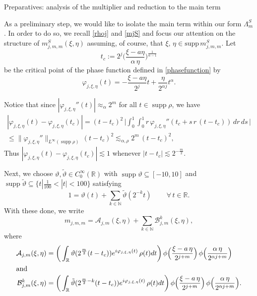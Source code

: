 \documentclass[a4paper,reqno]{amsart}
\makeatletter
\def\subsubsection{\@startsection{subsubsection}{3}%
	\z@{.5\linespacing\@plus.7\linespacing}{-.5em}%
	{\normalfont\bfseries\boldmath}}
\numberwithin{equation}{section}
\theoremstyle{definition}
\newcommand{\R}{\mathbb{R}}
\newcommand{\N}{\mathbb{N}}
\def\a{\alpha}
\def\B{\mathcal{B}}
\def\L{\Lambda}
\DeclareMathOperator{\supp}{supp}
\makeatother
\begin{document}
\subsubsection{Preparatives: analysis of the multiplier and reduction to the main term}

As a preliminary step, we would like to isolate the main term within our form $\L_m^{S}$. In order to do so, we recall \eqref{rhoj} and \eqref{mjS} and focus our attention on the structure of $m_{j,m,m}^S(\xi, \eta)$ assuming, of course, that $\xi,\, \eta\in \textrm{supp}\,m_{j,m,m}^S$. Let
\begin{equation}
t_c:=2^j\Big(\frac{\xi-a\eta}{\a\,\eta}\Big)^{\frac1{\a-1}}
\end{equation}
be the critical point of the phase function defined in \eqref{phasefunction} by
\begin{equation*}
\varphi_{j,\xi,\eta}(t)=-\frac{\xi-a\eta}{2^j}t+\frac{\eta}{2^{\a j}}t^\a.
\end{equation*}

Notice that since $|\varphi_{j,\xi,\eta}''(t)|\approx_\a 2^m$ for all $t\in\supp\rho$, we have
\begin{align*}
|\varphi_{j,\xi,\eta}(t)-\varphi_{j,\xi,\eta}(t_c)|=(t-t_c)^2\,\Big|\int_0^1\int_0^1 r\,\varphi_{j,\xi,\eta}''(t_c+s\,r\,(t-t_c))\, dr\,ds\,\Big|\\[1ex]
\le \|\varphi_{j,\xi,\eta}''\|_{L^\infty(\supp\rho)}\,(t-t_c)^2\lesssim_{\a,\rho} 2^m\,(t-t_c)^2,
\end{align*}
Thus $|\varphi_{j,\xi,\eta}(t)-\varphi_{j,\xi,\eta}(t_c)|\lesssim 1$ whenever $|t-t_c|\lesssim 2^{-\frac{m}2}$.

Next, we choose $\vartheta, \tilde{\vartheta} \in C_0^\infty(\R)$ with $\supp\vartheta\subseteq [-10,10]$ and $ \supp\tilde{\vartheta}\subseteq\{t|\frac{1}{100}<|t|<100\}$ satisfying
\[
1=\vartheta(t)+\sum_{k\in\N}\tilde\vartheta(2^{-k}t)\,\qquad \forall\, t\in\R.
\]
With these done, we write
\begin{equation}
m_{j,m,m}=\mathcal{A}_{j,m}(\xi,\eta)+\sum_{k\in\N}\B_{j,m}^k(\xi,\eta),
\end{equation}
where
\begin{align*}
\mathcal{A}_{j,m}(\xi,\eta)&=\bigg(\int_\R \vartheta(2^{\frac{m}{2}}(t-t_c)) e^{i\varphi_{j,\xi,\eta}(t)}\, \rho(t)dt\bigg)\,\phi\Big(\frac{\xi-a\,\eta}{2^{j+m}}\Big)\,\phi\Big(\frac{\a\,\eta}{2^{\a j+m}}\Big)\\
\intertext{and}
\B_{j,m}^k(\xi,\eta)&=\bigg(\int_\R \tilde{\vartheta}(2^{\frac{m}{2}-k}(t-t_c)) e^{i\varphi_{j,\xi,\eta}(t)}\, \rho(t)dt\bigg)\,\phi\Big(\frac{\xi-a\,\eta}{2^{j+m}}\Big)\,\phi\Big(\frac{\a\,\eta}{2^{\a j+m}}\Big).
\end{align*}
\end{document}

